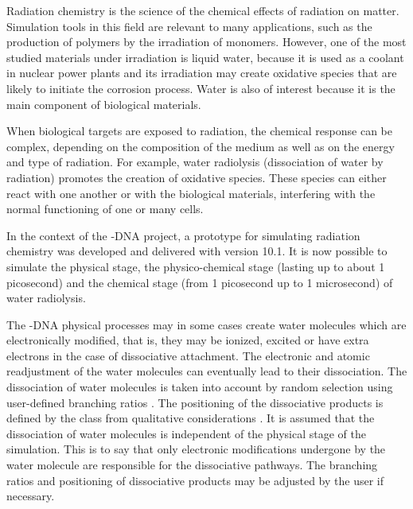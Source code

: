 
Radiation chemistry is the science of the chemical effects of radiation on
matter.  Simulation tools in this field are relevant to many applications, such
as the production of polymers by the irradiation of monomers.  However, one of
the most studied materials under irradiation is liquid water, because it is used
as a coolant in nuclear power plants and its irradiation may create oxidative 
species that are likely to initiate the corrosion process.  Water is also of 
interest because it is the main component of biological materials.

When biological targets are exposed to radiation, the chemical response can be 
complex, depending on the composition of the medium as well as on the energy and
type of radiation.  For example, water radiolysis (dissociation of water by 
radiation) promotes the creation of oxidative species.  These species can either
react with one another or with the biological materials, interfering with the 
normal functioning of one or many cells.

In the context of the \Gfour{}-DNA project, a prototype for simulating radiation 
chemistry was developed \cite{embib:dna3, embib:chem:paper1} and delivered with
\Gfour{} version 10.1.  It is now possible to simulate the physical stage, the 
physico-chemical stage (lasting up to about 1 picosecond) and the chemical stage
(from 1 picosecond up to 1 microsecond) of water radiolysis.

The \Gfour{}-DNA physical processes may in some cases create
water molecules which are electronically modified, that is, they may be ionized,
excited or have extra electrons in the case of dissociative attachment.  The 
electronic and atomic readjustment of the water molecules can eventually lead to
their dissociation.  The dissociation of water molecules is taken into account 
by random selection using user-defined branching ratios \cite{embib:chem:paper1}.
The positioning of the dissociative products is defined by the 
 class from qualitative 
considerations \cite{embib:chem:Kreipl2009}.  It is assumed that the 
dissociation of water molecules is independent of the physical stage of the 
simulation.  This is to say that only electronic modifications undergone by the
water molecule are responsible for the dissociative pathways.  The branching 
ratios and positioning of dissociative products may be adjusted by the user if 
necessary.

